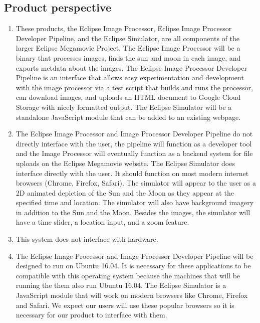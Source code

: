 \documentclass[10pt, onecolumn, draftclsnofoot, letterpaper, compsoc]{IEEEtran}
\begin{document}
\subsection{Product perspective}
	\begin{enumerate}
		\item These products, the Eclipse Image Processor, Eclipse Image
		Processor Developer Pipeline, and the Eclipse Simulator, are all components of
		the larger Eclipse Megamovie Project. The Eclipse Image Processor will be
		a binary that processes images, finds the sun and moon in each image, and
        exports metdata about the images. The Eclipse Image Processor Developer
        Pipeline is an interface that allows easy experimentation and development
        with the image processor via a test script that builds and runs the processor, can
        download images, and uploads an HTML document to Google Cloud Storage
        with nicely formatted output. The Eclipse Simulator will be a standalone
        JavaScript module that can be added to an existing webpage.

		\item The Eclipse Image Processor and Image Processor Developer Pipeline
		do not directly interface with the user, the pipeline will function as a
        developer tool and the Image Processor will eventually function as a backend
        system for file uploads on the Eclipse Megamovie website.
		The Eclipse Simulator does interface
		directly with the user. It should function on most modern
		internet browsers (Chrome, Firefox, Safari). The simulator
		will appear to the user as a 2D animated depiction of the
		Sun and the Moon as they appear at the specified time and
		location. The simulator will also have background imagery in
		addition to the Sun and the Moon. Besides the images, the
		simulator will have a time slider, a location input, and a zoom feature.

		\item This system does not interface with hardware.

		\item The Eclipse Image Processor and Image Processor Developer Pipeline
		will be designed to run on Ubuntu 16.04. It is necessary for these
		applications to be compatible with this operating system because
		the machines that will be running the them also run Ubuntu 16.04. The Eclipse
		Simulator is a JavaScript module that will work on modern
		browsers like Chrome, Firefox and Safari. We expect our
		users will use these popular browsers so it is necessary
		for our product to interface with them.
	\end{enumerate}
\end{document}
